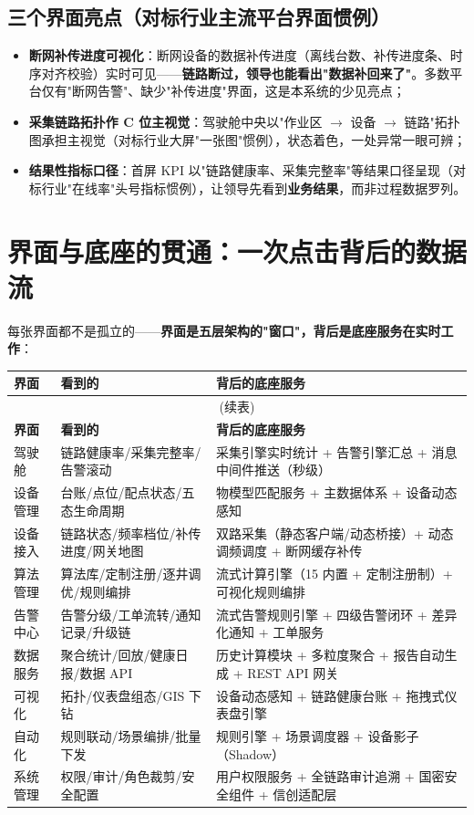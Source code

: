 \documentclass[11pt,a4paper]{ctexart}
\begin{document}
\subsection{三个界面亮点（对标行业主流平台界面惯例）}

\begin{itemize}[leftmargin=*]
  \item \textbf{断网补传进度可视化}：断网设备的数据补传进度（离线台数、补传进度条、时序对齐校验）实时可见——\textbf{链路断过，领导也能看出"数据补回来了"}。多数平台仅有"断网告警"、缺少"补传进度"界面，这是本系统的少见亮点；
  \item \textbf{采集链路拓扑作 C 位主视觉}：驾驶舱中央以"作业区 $\rightarrow$ 设备 $\rightarrow$ 链路"拓扑图承担主视觉（对标行业大屏"一张图"惯例），状态着色，一处异常一眼可辨；
  \item \textbf{结果性指标口径}：首屏 KPI 以"链路健康率、采集完整率"等结果口径呈现（对标行业"在线率"头号指标惯例），让领导先看到\textbf{业务结果}，而非过程数据罗列。
\end{itemize}

\section{界面与底座的贯通：一次点击背后的数据流}

每张界面都不是孤立的——\textbf{界面是五层架构的"窗口"，背后是底座服务在实时工作}：

\begin{longtable}{p{2.4cm} p{5.4cm} p{6.0cm}}
\toprule
\textbf{界面} & \textbf{看到的} & \textbf{背后的底座服务} \\
\midrule
\endfirsthead
\multicolumn{3}{c}{(续表)} \\
\toprule
\textbf{界面} & \textbf{看到的} & \textbf{背后的底座服务} \\
\midrule
\endhead
驾驶舱 & 链路健康率/采集完整率/告警滚动 & 采集引擎实时统计 + 告警引擎汇总 + 消息中间件推送（秒级） \\
设备管理 & 台账/点位/配点状态/五态生命周期 & 物模型匹配服务 + 主数据体系 + 设备动态感知 \\
设备接入 & 链路状态/频率档位/补传进度/网关地图 & 双路采集（静态客户端/动态桥接）+ 动态调频调度 + 断网缓存补传 \\
算法管理 & 算法库/定制注册/逐井调优/规则编排 & 流式计算引擎（15 内置 + 定制注册制）+ 可视化规则编排 \\
告警中心 & 告警分级/工单流转/通知记录/升级链 & 流式告警规则引擎 + 四级告警闭环 + 差异化通知 + 工单服务 \\
数据服务 & 聚合统计/回放/健康日报/数据 API & 历史计算模块 + 多粒度聚合 + 报告自动生成 + REST API 网关 \\
可视化 & 拓扑/仪表盘组态/GIS 下钻 & 设备动态感知 + 链路健康台账 + 拖拽式仪表盘引擎 \\
自动化 & 规则联动/场景编排/批量下发 & 规则引擎 + 场景调度器 + 设备影子（Shadow） \\
系统管理 & 权限/审计/角色裁剪/安全配置 & 用户权限服务 + 全链路审计追溯 + 国密安全组件 + 信创适配层 \\
\bottomrule
\end{longtable}
\end{document}
